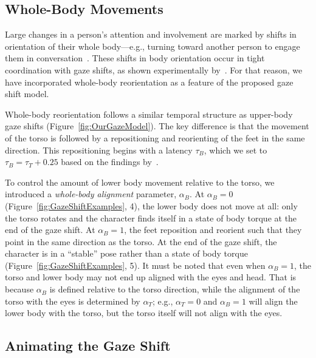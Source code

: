 \subsection{Whole-Body Movements}
\label{sec:GazeShiftWholeBody}

Large changes in a person's attention and involvement are marked by shifts in orientation of their whole body---e.g., turning toward another person to engage them in conversation~\citep{kendon1990conducting}. These shifts in body orientation occur in tight coordination with gaze shifts, as shown experimentally by~\citet{hollands2004wholebody}. For that reason, we have incorporated whole-body reorientation as a feature of the proposed gaze shift model.

Whole-body reorientation follows a similar temporal structure as upper-body gaze shifts (Figure~\ref{fig:OurGazeModel}). The key difference is that the movement of the torso is followed by a repositioning and reorienting of the feet in the same direction. This repositioning begins with a latency $\tau_B$, which we set to $\tau_B = \tau_T + 0.25$ based on the findings by~\citet{hollands2004wholebody}.

To control the amount of lower body movement relative to the torso, we introduced a \emph{whole-body alignment} parameter, $\alpha_B$. At $\alpha_B = 0$ (Figure~\ref{fig:GazeShiftExamples}, 4), the lower body does not move at all: only the torso rotates and the character finds itself in a state of body torque at the end of the gaze shift. At $\alpha_B = 1$, the feet reposition and reorient such that they point in the same direction as the torso. At the end of the gaze shift, the character is in a ``stable'' pose rather than a state of body torque (Figure~\ref{fig:GazeShiftExamples}, 5). It must be noted that even when $\alpha_B = 1$, the torso and lower body may not end up aligned with the eyes and head. That is because $\alpha_B$ is defined relative to the torso direction, while the alignment of the torso with the eyes is determined by $\alpha_T$; e.g., $\alpha_T = 0$ and $\alpha_B = 1$ will align the lower body with the torso, but the torso itself will not align with the eyes.

\subsection{Animating the Gaze Shift}
\label{sec:GazeShiftAnimation}

